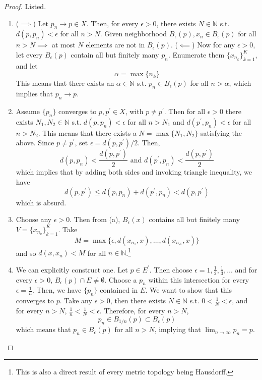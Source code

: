   \begin{proof}
    Listed. 
    \begin{enumerate}
      \item ($\implies$) Let $p_n \rightarrow p \in X$. Then, for every $\epsilon > 0$, there exists $N \in \mathbb{N}$ s.t. $d(p, p_n) < \epsilon$ for all $n > N$. Given neighborhood $B_\epsilon (p), x_n \in B_\epsilon (p)$ for all $n > N \implies$ at most $N$ elements are not in $B_\epsilon (p)$. ($\impliedby$) Now for any $\epsilon > 0$, let every $B_\epsilon (p)$ contain all but finitely many $p_n$. Enumerate them $\{x_{n_k}\}_{k=1}^K$, and let 
      \[\alpha = \max \{n_k\}\]
      This means that there exists an $\alpha \in \mathbb{N}$ s.t. $p_n \in B_\epsilon (p)$ for all $n > \alpha$, which implies that $p_n \rightarrow p$. 

      \item Assume $\{p_n\}$ converges to $p, p^\prime \in X$, with $p \neq p^\prime$. Then for all $\epsilon > 0$ there exists $N_1, N_2 \in \mathbb{N}$ s.t. $d(p, p_n) < \epsilon$ for all $n > N_1$ and $d(p^\prime, p_n) < \epsilon$ for all $n > N_2$. This means that there exists a $N = \max\{N_1, N_2\}$ satisfying the above. Since $p \neq p^\prime$, set $\epsilon = d(p, p^\prime) /2$. Then, 
      \[d(p, p_n) < \frac{d(p, p^\prime)}{2} \text{ and } d(p^\prime, p_n) < \frac{d(p, p^\prime)}{2}\]
      which implies that by adding both sides and invoking triangle inequality, we have 
      \[d(p, p^\prime) \leq d(p, p_n) + d(p^\prime, p_n) < d(p, p^\prime)\]
      which is absurd. 

      \item Choose any $\epsilon > 0$. Then from (a), $B_\epsilon (x)$ contains all but finitely many $V = \{x_{n_k}\}_{k=1}^K$. Take 
      \[M = \max \{\epsilon, d(x_{n_1}, x), \ldots, d(x_{n_K}, x)\}\]
      and so $d(x, x_n) < M$ for all $n \in \mathbb{N}$.\footnote{This is also a direct result of every metric topology being Hausdorff.}

      \item We can explicitly construct one. Let $p \in E^\prime$. Then choose $\epsilon = 1, \frac{1}{2}, \frac{1}{3}, \ldots$ and for every $\epsilon > 0$, $B_\epsilon (p) \cap E \neq \emptyset$. Choose a $p_n$ within this intersection for every $\epsilon = \frac{1}{n}$. Then, we have $\{p_n\}$ contained in $E$. We want to show that this converges to $p$. Take any $\epsilon > 0$, then there exists $N \in \mathbb{N}$ s.t. $0 < \frac{1}{N} < \epsilon$, and for every $n > N$, $\frac{1}{n} < \frac{1}{N} < \epsilon$. Therefore, for every $n > N$, 
      \[p_n \in B_{1/n} (p) \subset B_\epsilon (p)\]
      which means that $p_n \in B_\epsilon (p)$ for all $n > N$, implying that $\lim_{n \rightarrow \infty} p_n = p$. 
    \end{enumerate}
  \end{proof}

